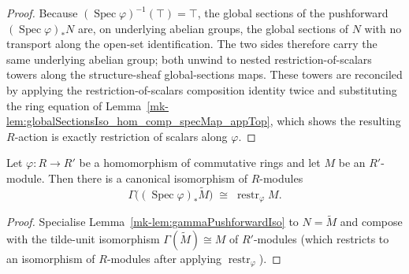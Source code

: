 \begin{proof}
  \leanok
  Because \((\operatorname{Spec}\varphi)^{-1}(\top) = \top\), the global sections of
  the pushforward \((\operatorname{Spec}\varphi)_* N\) are, on underlying abelian
  groups, the global sections of \(N\) with no transport along the open-set
  identification. The two sides therefore carry the same underlying abelian group;
  both unwind to nested restriction-of-scalars towers along the structure-sheaf
  global-sections maps. These towers are reconciled by applying the
  restriction-of-scalars composition identity twice and substituting the ring
  equation of
  Lemma~\ref{mk-lem:globalSectionsIso_hom_comp_specMap_appTop}, which shows the
  resulting \(R\)-action is exactly restriction of scalars along \(\varphi\).
\end{proof}

\begin{lemma}\label{mk-lem:gammaPushforwardTildeIso}
  \leanok

  Let \(\varphi : R \to R'\) be a homomorphism of commutative rings and let \(M\)
  be an \(R'\)-module. Then there is a canonical isomorphism of \(R\)-modules
  \[
    \Gamma\bigl((\operatorname{Spec}\varphi)_* \widetilde{M}\bigr)
    \;\cong\;
    \operatorname{restr}_\varphi M .
  \]
\end{lemma}

\begin{proof}
  \leanok
  Specialise Lemma~\ref{mk-lem:gammaPushforwardIso} to \(N = \widetilde{M}\) and
  compose with the tilde-unit isomorphism
  \(\Gamma(\widetilde{M}) \cong M\) of \(R'\)-modules (which restricts to an
  isomorphism of \(R\)-modules after applying \(\operatorname{restr}_\varphi\)).
\end{proof}

